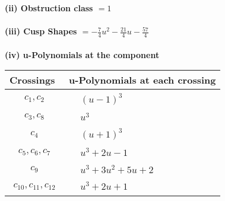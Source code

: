 \documentclass[1p]{elsarticle_modified}
\theoremstyle{definition}
\begin{document}
\flushleft \textbf{(ii) Obstruction class $= 1$}\\~\\
\flushleft \textbf{(iii) Cusp Shapes $= -\frac{7}{4} u^2-\frac{21}{4} u-\frac{57}{4}$}\\~\\
\newpage\renewcommand{\arraystretch}{1}
\flushleft \textbf{(iv) u-Polynomials at the component}\newline \\
\begin{tabular}{m{50pt}|m{274pt}}
Crossings & \hspace{64pt}u-Polynomials at each crossing \\
\hline $$\begin{aligned}c_{1},c_{2}\end{aligned}$$&$\begin{aligned}
&(u-1)^3
\end{aligned}$\\
\hline $$\begin{aligned}c_{3},c_{8}\end{aligned}$$&$\begin{aligned}
&u^3
\end{aligned}$\\
\hline $$\begin{aligned}c_{4}\end{aligned}$$&$\begin{aligned}
&(u+1)^3
\end{aligned}$\\
\hline $$\begin{aligned}c_{5},c_{6},c_{7}\end{aligned}$$&$\begin{aligned}
&u^3+2 u-1
\end{aligned}$\\
\hline $$\begin{aligned}c_{9}\end{aligned}$$&$\begin{aligned}
&u^3+3 u^2+5 u+2
\end{aligned}$\\
\hline $$\begin{aligned}c_{10},c_{11},c_{12}\end{aligned}$$&$\begin{aligned}
&u^3+2 u+1
\end{aligned}$\\
\hline
\end{tabular}\\~\\
\end{document}
